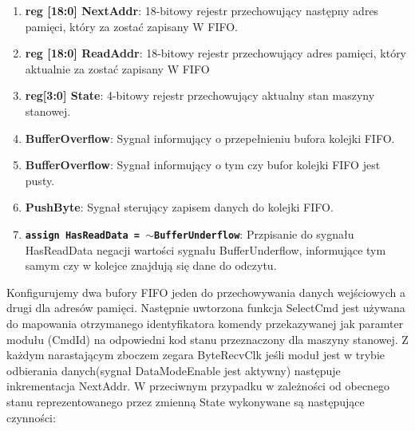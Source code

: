 \documentclass[12pt, a4paper]{article}
\begin{document}
\begin{enumerate}
    \item \textbf{\fontsize{11}{10}\selectfont reg [18:0] NextAddr}: 18-bitowy rejestr przechowujący następny adres pamięci, który za zostać zapisany W FIFO.
    \item \textbf{\fontsize{11}{10}\selectfont reg [18:0] ReadAddr}: 18-bitowy rejestr przechowujący adres pamięci, który aktualnie za zostać zapisany W FIFO
    \item \textbf{\fontsize{11}{10}\selectfont reg[3:0] State}: 4-bitowy rejestr przechowujący aktualny stan maszyny stanowej.
    \item \textbf{\fontsize{11}{10}\selectfont BufferOverflow}: Sygnał informujący o przepełnieniu bufora kolejki FIFO.
    \item \textbf{\fontsize{11}{10}\selectfont BufferOverflow}: Sygnał informujący o tym czy bufor kolejki FIFO jest pusty.
    \item \textbf{\fontsize{11}{10}\selectfont PushByte}: Sygnał sterujący zapisem danych do kolejki FIFO.
    \item \textbf{\fontsize{11}{10}\selectfont \texttt{assign HasReadData = \(\sim\)BufferUnderflow}}: Przpisanie do sygnału HasReadData negacji wartości sygnału BufferUnderflow, informujące tym samym czy w kolejce znajdują się dane do odczytu.


\end{enumerate}
Konfigurujemy dwa bufory FIFO jeden do przechowywania danych wejściowych a drugi dla adresów pamięci.
Następnie uwtorzona funkcja SelectCmd jest używana do mapowania otrzymanego identyfikatora komendy przekazywanej jak paramter modułu (CmdId) na odpowiedni kod stanu przeznaczony dla  maszyny stanowej.
Z każdym narastającym zboczem zegara ByteRecvClk jeśli moduł jest w trybie odbierania danych(sygnał DataModeEnable jest aktywny) następuje inkrementacja NextAddr. W przeciwnym przypadku w zależności od obecnego stanu reprezentowanego przez zmienną State wykonywane są następujące czynności:
\end{document}
